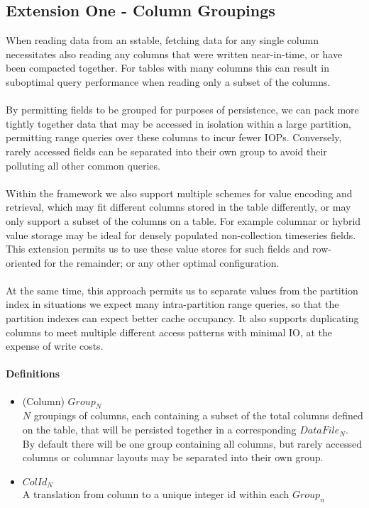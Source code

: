 \documentclass[fleqn]{article}
\begin{document}
\subsection{Extension One - Column Groupings}
\small
When reading data from an sstable, fetching data for any single column necessitates also
reading any columns that were written near-in-time, or have
been compacted together. For tables with many columns this can result in suboptimal query
performance when reading only a subset of the columns.
\\\\
By permitting fields to be grouped for purposes of persistence, we can pack more tightly together data
that may be accessed in isolation within a large partition, permitting range queries over these columns
to incur fewer IOPs. Conversely, rarely accessed fields can be separated into their own group
to avoid their polluting all other common queries.
\\\\ 
Within the framework we also support multiple schemes for value encoding and retrieval, 
which may fit different columns stored in the table differently, or may only support a subset 
of the columns on a table. For example columnar or hybrid value storage may be ideal for
densely populated non-collection timeseries fields. This extension permits us to use these value stores
for such fields  and row-oriented for the remainder; or any other optimal configuration.
\\\\
At the same time, this approach permits us to separate values from the partition index in situations 
we expect many intra-partition range queries, so that the partition indexes can expect better cache occupancy.
It also supports duplicating columns to meet multiple different access patterns with minimal IO, at the expense
of write costs.

\paragraph{Definitions}
\begin{itemize}
  \item (Column) $Group_N$\\[2pt]
    $N$ groupings of columns, each containing a subset of the total columns defined on the table, 
    that will be persisted together in a corresponding $DataFile_N$. By default there will be one 
    group containing all columns, but rarely accessed columns or columnar layouts may be separated 
    into their own group.
  \item $ColId_N$\\[2pt]
    A translation from column to a unique integer id within each $Group_n$
\end{itemize}
\end{document}
